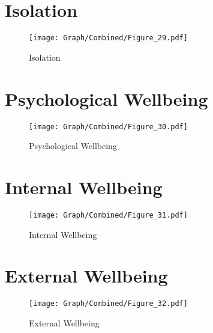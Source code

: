 \documentclass[10pt,a4paper]{article}
\begin{document}
\section{Isolation}
\begin{table}[H]\centering

\end{table}
\begin{figure}[H]\centering
\texttt{[image: Graph/Combined/Figure\_29.pdf]}
\caption{Isolation} \label{fig:Fig_29}
\end{figure}
\begin{table}[H]\centering

\end{table}
\pagebreak
\section{Psychological Wellbeing}
\begin{table}[H]\centering

\end{table}
\begin{figure}[H]\centering
\texttt{[image: Graph/Combined/Figure\_30.pdf]}
\caption{Psychological Wellbeing} \label{fig:Fig_30}
\end{figure}
\begin{table}[H]\centering

\end{table}
\pagebreak
\section{Internal Wellbeing}
\begin{table}[H]\centering

\end{table}
\begin{figure}[H]\centering
\texttt{[image: Graph/Combined/Figure\_31.pdf]}
\caption{Internal Wellbeing} \label{fig:Fig_31}
\end{figure}
\begin{table}[H]\centering

\end{table}
\pagebreak
\section{External Wellbeing}
\begin{table}[H]\centering

\end{table}
\begin{figure}[H]\centering
\texttt{[image: Graph/Combined/Figure\_32.pdf]}
\caption{External Wellbeing} \label{fig:Fig_32}
\end{figure}
\begin{table}[H]\centering

\end{table}
\pagebreak
\end{document}
